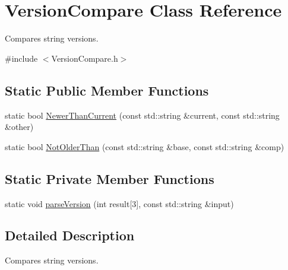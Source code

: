 \hypertarget{classVersionCompare}{\section{Version\-Compare Class Reference}
\label{classVersionCompare}
}


Compares string versions.  




{\ttfamily \#include $<$Version\-Compare.\-h$>$}

\subsection*{Static Public Member Functions}
\begin{DoxyCompactItemize}
\item 
static bool \hyperlink{classVersionCompare_a237db39cbf335ed106f4fa2dc087cb36}{Newer\-Than\-Current} (const std\-::string \&current, const std\-::string \&other)
\item 
static bool \hyperlink{classVersionCompare_af38a74d5e52e5f862c9d3c0f3a96cb6b}{Not\-Older\-Than} (const std\-::string \&base, const std\-::string \&comp)
\end{DoxyCompactItemize}
\subsection*{Static Private Member Functions}
\begin{DoxyCompactItemize}
\item 
static void \hyperlink{classVersionCompare_a1fdc3833968e1579942fc420daed6dd9}{parse\-Version} (int result\mbox{[}3\mbox{]}, const std\-::string \&input)
\end{DoxyCompactItemize}


\subsection{Detailed Description}
Compares string versions. 

